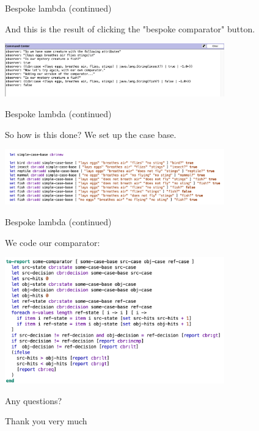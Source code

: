 \documentclass[usenames,dvipsnames,10pt]{beamer} %
\begin{document}
\begin{frame}{Bespoke lambda (continued)}

    And this is the result of clicking the "bespoke comparator" button.

    \vspace{1cm}

    \includegraphics[width=9.5cm]{img/bespoke-comparator-result.png}

\end{frame}

\begin{frame}{Bespoke lambda (continued)}

    So how is this done? We set up the case base.

    \vspace{0.5cm}

    \includegraphics[width=9.5cm]{img/bespoke-comparator-case-base.png}

\end{frame}

\begin{frame}{Bespoke lambda (continued)}

   We code our comparator: 

    \vspace{0.5cm}

    \includegraphics[width=9.5cm]{img/bespoke-comparator-code.png}


\end{frame}

\begin{frame}

    \vspace{1cm}

    Any questions?

    \vspace{1cm}

    Thank you very much
\finalpage
\end{frame}
\end{document}
